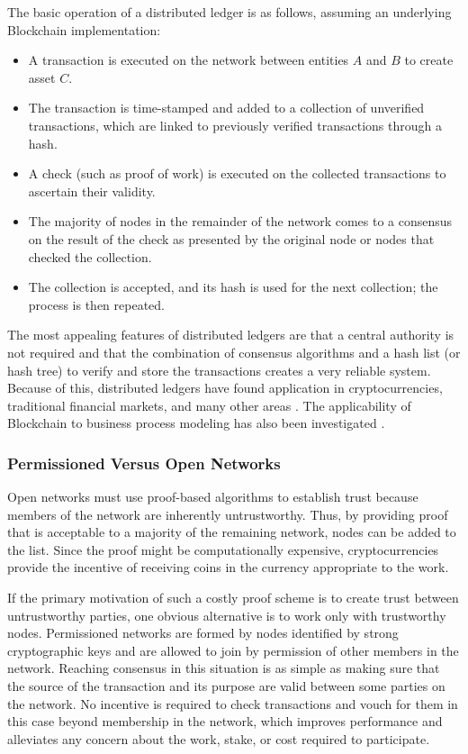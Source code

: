 The basic operation of a distributed ledger is as follows, assuming an
underlying Blockchain implementation:
\begin{itemize}
    \item A transaction is executed on the network between entities $A$ and $B$
    to create asset $C$.
    \item The transaction is time-stamped and added to a collection of
    unverified transactions, which are linked to previously verified
    transactions through a hash.
    \item A check (such as proof of work) is executed on the collected
    transactions to ascertain their validity.
    \item The majority of nodes in the remainder of the network comes to a
    consensus on the result of the check as presented by the original node or
    nodes that checked the collection.
    \item The collection is accepted, and its hash is used for the next
    collection; the process is then repeated.
\end{itemize}

The most appealing features of distributed ledgers are that a central authority
is not required and that the combination of consensus algorithms and a hash list
(or hash tree) to verify and store the transactions creates a very reliable
system. Because of this, distributed ledgers have found application in
cryptocurrencies, traditional financial markets, and many other areas
\cite{noauthor_groups:requirements:use-case-inventory_nodate}
\cite{noauthor_discussion_2018}. The applicability of Blockchain to business
process modeling has also been investigated
\cite{mendling_blockchains_2018}.

\subsubsection{Permissioned Versus Open Networks}
Open networks must use proof-based algorithms to establish trust because members
of the network are inherently untrustworthy. Thus, by providing proof that is
acceptable to a majority of the remaining network, nodes can be added to the
list. Since the proof might be computationally expensive, cryptocurrencies
provide the incentive of receiving coins in the currency appropriate to the
work.

If the primary motivation of such a costly proof scheme is to create trust
between untrustworthy parties, one obvious alternative is to work only with
trustworthy nodes. Permissioned networks are formed by nodes identified by
strong cryptographic keys and are allowed to join by permission of other members
in the network. Reaching consensus in this situation is as simple as making sure
that the source of the transaction and its purpose are valid between some
parties on the network. No incentive is required to check transactions and vouch
for them in this case beyond membership in the network, which improves
performance and alleviates any concern about the work, stake, or cost required
to participate.


